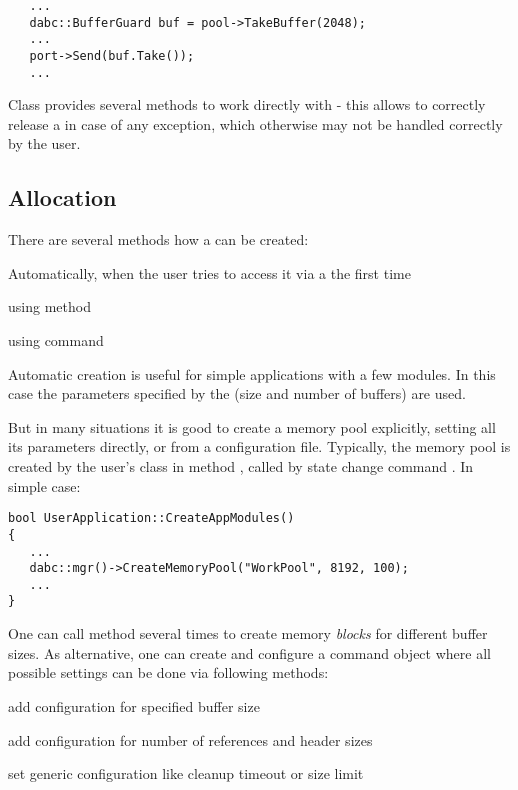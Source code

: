 \begin{small}
\begin{verbatim}     
   ...
   dabc::BufferGuard buf = pool->TakeBuffer(2048);
   ...
   port->Send(buf.Take());
   ...
\end{verbatim}     
\end{small}

Class  provides several methods to work directly 
with  - this allows to correctly release a 
in case of any exception, which otherwise may not be handled correctly by the user.  


\subsection{Allocation}
\label{prog_services_memory_allocation}
There are several methods how a  can be created:
\bbul
\item Automatically, when the user  tries to access it via a 
 the first time

\item using  method

\item using  command
\ebul

Automatic creation is useful for simple applications with a few modules.
In this case the parameters specified by the 
 (size and number of buffers) are used. 

But in many situations it is good to create a memory pool explicitly,
setting all its parameters directly, or from a  configuration file.
Typically, the memory pool is created by the user's  class in 
method , called by state change command .
In simple case:

\begin{small}
\begin{verbatim}     
bool UserApplication::CreateAppModules()
{
   ...
   dabc::mgr()->CreateMemoryPool("WorkPool", 8192, 100);
   ...
}
\end{verbatim}     
\end{small}

One can call  method several times to create 
memory {\em blocks} for different buffer sizes. As alternative, one can create and 
configure a command object  
where all possible settings can be done via following methods:
\bbul
\item[\func{AddMem()}] add configuration for specified buffer size 
\item[\func{AddRef()}] add configuration for number of references and header sizes 
\item[\func{AddCfg()}] set generic configuration like cleanup timeout or size limit 
\ebul

